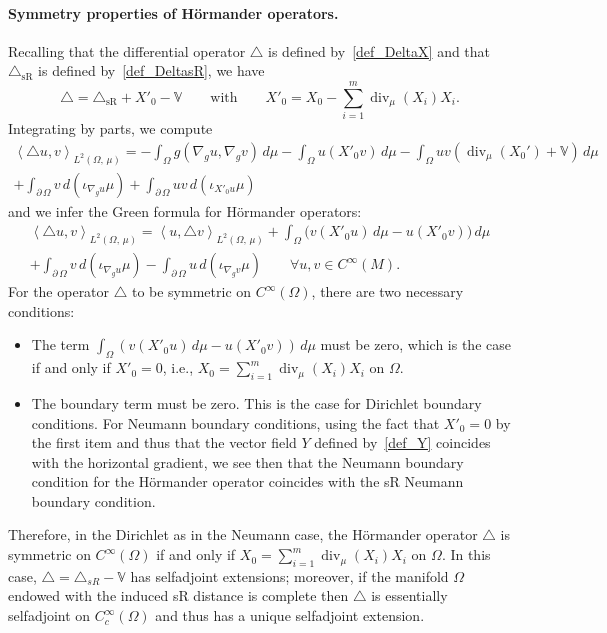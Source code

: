 \documentclass[AHL,Unicode,published]{cedram}
\newcommand{\bbV}{\mathbb{V}}
\DeclareMathOperator{\divl}{div}
\newcommand{\trianglesR}{\triangle_{\mathrm{sR}}}
\let\oldforall\forall
\renewcommand*{\forall}{\mathrel{\oldforall}}
\begin{document}
\paragraph{Symmetry properties of H\"ormander operators.} Recalling that the differential operator $\triangle$ is defined by~\eqref{def_DeltaX} and that $\trianglesR$ is defined by~\eqref{def_DeltasR}, we have
\[
\triangle = \trianglesR + X'_0 - \bbV
\qquad\text{with}\qquad X'_0=X_0 - \sum_{i=1}^m\divl_\mu(X_i)X_i.
\]
Integrating by parts, we compute
\begin{multline*}
\left\langle \triangle u,v\right\rangle_{L^2(\Omega,\,\mu)} = -\int_\Omega g\left(\nabla_gu,\nabla_gv\right)\,d\mu - \int_\Omega u(X'_0v)\, d\mu - \int_\Omega uv \left(\divl_\mu\left(X_0'\right)+ \bbV\right) \, d\mu \\
+ \int_{\partial\,\Omega} v\, d\left(\iota_{\nabla_gu} \mu\right) + \int_{\partial\,\Omega} uv\, d\left(\iota_{X'_0u} \mu\right)
\end{multline*}
and we infer the Green formula for H\"ormander operators:
\begin{multline*}
\left\langle \triangle u,v\right\rangle_{L^2(\Omega,\,\mu)} = \left\langle u,\triangle v\right\rangle_{L^2(\Omega,\,\mu)} + \int_\Omega \big(v(X'_0u)\, d\mu - u(X'_0v)\big)\, d\mu \\
+ \int_{\partial\,\Omega} v\, d\left(\iota_{\nabla_gu} \mu\right) - \int_{\partial\,\Omega} u\, d\left(\iota_{\nabla_gv} \mu\right) \qquad \forall u,v\in C^\infty(M).
\end{multline*}
For the operator $\triangle$ to be symmetric on $C^\infty(\Omega)$, there are two necessary conditions:
\begin{itemize}
\item The term $\int_\Omega (v(X'_0u)\, d\mu - u(X'_0v))\, d\mu$ must be zero, which is the case if and only if $X'_0=0$, i.e., $X_0 = \sum_{i=1}^m \divl_\mu(X_i) X_i$ on $\Omega$.
\item The boundary term must be zero. This is the case for Dirichlet boundary conditions. For Neumann boundary conditions, using the fact that $X'_0=0$ by the first item and thus that the vector field $Y$ defined by~\eqref{def_Y} coincides with the horizontal gradient, we see then that the Neumann boundary condition for the H\"ormander operator coincides with the sR Neumann boundary condition.
\end{itemize}
Therefore, in the Dirichlet as in the Neumann case, the H\"ormander operator $\triangle$ is symmetric on $C^\infty(\Omega)$ if and only if $X_0 = \sum_{i=1}^m \divl_\mu(X_i) X_i$ on $\Omega$. In this case, $\triangle = \triangle_{sR} - \bbV$ has selfadjoint extensions; moreover, if the manifold $\Omega$ endowed with the induced sR distance is complete then $\triangle$ is essentially selfadjoint on $C_c^\infty(\Omega)$ and thus has a unique selfadjoint extension.
\end{document}
